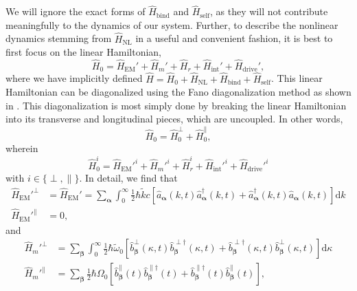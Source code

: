 \documentclass{article}
\begin{document}
We will ignore the exact forms of $\hat{H}_\mathrm{bind}$ and $\hat{H}_\mathrm{self}$, as they will not contribute meaningfully to the dynamics of our system. Further, to describe the nonlinear dynamics stemming from $\hat{H}_\mathrm{NL}$ in a useful and convenient fashion, it is best to first focus on the linear Hamiltonian,
\begin{equation}
\hat{H}_0 = \hat{H}_\mathrm{EM}' + \hat{H}_m' + \hat{H}_r + \hat{H}_\mathrm{int}' + \hat{H}_\mathrm{drive}',
\end{equation}
where we have implicitly defined $\hat{H} = \hat{H}_0 + \hat{H}_\mathrm{NL} + \hat{H}_\mathrm{bind} + \hat{H}_\mathrm{self}$. This linear Hamiltonian can be diagonalized using the Fano diagonalization method as shown in \citet{huttner1992quantization}. This diagonalization is most simply done by breaking the linear Hamiltonian into its transverse and longitudinal pieces, which are uncoupled. In other words,
\begin{equation}
\hat{H}_0 = \hat{H}_0^\perp + \hat{H}_0^\parallel,
\end{equation}
wherein
\begin{equation}
\hat{H}_0^i = \hat{H}_\mathrm{EM}'^i + \hat{H}_m'^i + \hat{H}_r^i + \hat{H}_\mathrm{int}'^i + \hat{H}_\mathrm{drive}'^i
\end{equation}
with $i\in\{\perp,\parallel\}$. In detail, we find that
\begin{equation}
\begin{split}
\hat{H}_\mathrm{EM}'^\perp &= \hat{H}_{\mathrm{EM}}' = \sum_{\bm{\alpha}}\int_0^\infty\frac{1}{2}\hbar\tilde{k}c\left[\hat{a}_{\bm{\alpha}}(k,t)\hat{a}_{\bm{\alpha}}^\dagger(k,t) + \hat{a}_{\bm{\alpha}}^\dagger(k,t)\hat{a}_{\bm{\alpha}}(k,t)\right]\mathrm{d}k\\
\hat{H}_\mathrm{EM}'^\parallel &= 0,
\end{split}
\end{equation}
and
\begin{equation}
\begin{split}
\hat{H}_m'^\perp &= \sum_{\bm{\beta}}\int_0^\infty\frac{1}{2}\hbar\tilde{\omega}_0\left[\hat{b}_{\bm{\beta}}^\perp(\kappa,t)\hat{b}_{\bm{\beta}}^{\perp\dagger}(\kappa,t) + \hat{b}_{\bm{\beta}}^{\perp\dagger}(\kappa,t)\hat{b}_{\bm{\beta}}^\perp(\kappa,t)\right]\mathrm{d}\kappa\\
\hat{H}_m'^\parallel &= \sum_{\bm{\beta}}\frac{1}{2}\hbar\Omega_0\left[\hat{b}_{\bm{\beta}}^\parallel(t)\hat{b}_{\bm{\beta}}^{\parallel\dagger}(t) + \hat{b}_{\bm{\beta}}^{\parallel\dagger}(t)\hat{b}_{\bm{\beta}}^\parallel(t)\right],\\
\end{split}
\end{equation}
\end{document}
